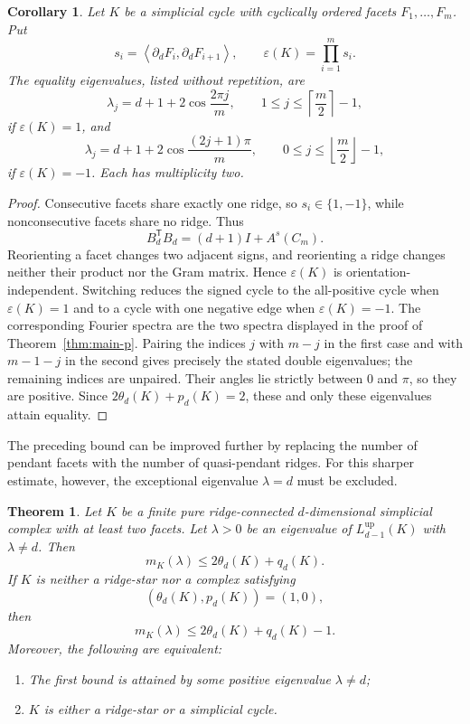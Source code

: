 \documentclass[12pt]{article}
\newtheorem{theorem}{Theorem}
\newtheorem{corollary}{Corollary}
\theoremstyle{remark}
\begin{document}
\begin{corollary}\label{cor:equality-spectrum}
Let $K$ be a simplicial cycle with cyclically ordered facets $F_1,\ldots,F_m$.  Put
\[
s_i=\left\langle\partial_dF_i,\partial_dF_{i+1}\right\rangle,
\qquad
\varepsilon(K)=\prod_{i=1}^m s_i.
\]
The equality eigenvalues, listed without repetition, are
\[
\lambda_j=d+1+2\cos\frac{2\pi j}{m},
\qquad
1\le j\le\left\lceil\frac m2\right\rceil-1,
\]
if $\varepsilon(K)=1$, and
\[
\lambda_j=d+1+2\cos\frac{(2j+1)\pi}{m},
\qquad
0\le j\le\left\lfloor\frac m2\right\rfloor-1,
\]
if $\varepsilon(K)=-1$.  Each has multiplicity two.
\end{corollary}

\begin{proof}
Consecutive facets share exactly one ridge, so $s_i\in\{1,-1\}$, while nonconsecutive facets share no ridge.  Thus
\[
B_d^{\mathsf T}B_d=(d+1)I+A^s(C_m).
\]
Reorienting a facet changes two adjacent signs, and reorienting a ridge changes neither their product nor the Gram matrix.  Hence $\varepsilon(K)$ is orientation-independent.  Switching reduces the signed cycle to the all-positive cycle when $\varepsilon(K)=1$ and to a cycle with one negative edge when $\varepsilon(K)=-1$.  The corresponding Fourier spectra are the two spectra displayed in the proof of Theorem~\ref{thm:main-p}.  Pairing the indices $j$ with $m-j$ in the first case and with $m-1-j$ in the second gives precisely the stated double eigenvalues; the remaining indices are unpaired.  Their angles lie strictly between $0$ and $\pi$, so they are positive.  Since $2\theta_d(K)+p_d(K)=2$, these and only these eigenvalues attain equality.
\end{proof}

The preceding bound can be improved further by replacing the number of pendant facets with the number of quasi-pendant ridges.  For this sharper estimate, however, the exceptional eigenvalue $\lambda=d$ must be excluded.

\begin{theorem}\label{thm:main-q}
Let $K$ be a finite pure ridge-connected $d$-dimensional simplicial complex with at least two facets.  Let $\lambda>0$ be an eigenvalue of $L^{\mathrm{up}}_{d-1}(K)$ with $\lambda\ne d$.
Then
\[
m_K(\lambda)\le2\theta_d(K)+q_d(K).
\]
If $K$ is neither a ridge-star nor a complex satisfying
\[
(\theta_d(K),p_d(K))=(1,0),
\]
then
\[
m_K(\lambda)\le2\theta_d(K)+q_d(K)-1.
\]
Moreover, the following are equivalent:
\begin{enumerate}
\item[(i)] The first bound is attained by some positive eigenvalue $\lambda\ne d$;
\item[(ii)] $K$ is either a ridge-star or a simplicial cycle.
\end{enumerate}
\end{theorem}
\end{document}
